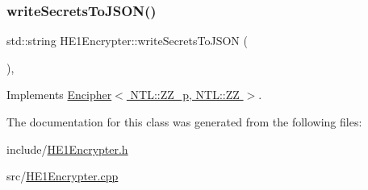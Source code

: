 \mbox{\label{classHE1Encrypter_a05627c66faf89c133a24fa7bb4553ef2}} 
\subsubsection{\texorpdfstring{write\+Secrets\+To\+J\+S\+O\+N()}{writeSecretsToJSON()}}
{\footnotesize\ttfamily std\+::string H\+E1\+Encrypter\+::write\+Secrets\+To\+J\+S\+ON (\begin{DoxyParamCaption}{ }\end{DoxyParamCaption})\hspace{0.3cm}{\ttfamily [override]}, {\ttfamily [virtual]}}



Implements \hyperlink{classEncipher_a27d3efa1e364c1f0d7def65454c61b85}{Encipher$<$ N\+T\+L\+::\+Z\+Z\+\_\+p, N\+T\+L\+::\+Z\+Z $>$}.



The documentation for this class was generated from the following files\+:\begin{DoxyCompactItemize}
\item 
include/\hyperlink{HE1Encrypter_8h}{H\+E1\+Encrypter.\+h}\item 
src/\hyperlink{HE1Encrypter_8cpp}{H\+E1\+Encrypter.\+cpp}\end{DoxyCompactItemize}
